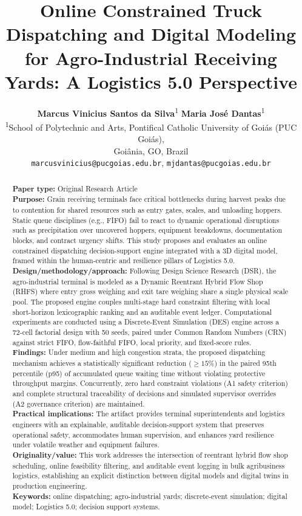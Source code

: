 \documentclass[11pt,a4paper]{article}
\title{\textbf{Online Constrained Truck Dispatching and Digital Modeling for Agro-Industrial Receiving Yards: A Logistics 5.0 Perspective}}
\author{
  \textbf{Marcus Vinicius Santos da Silva}\textsuperscript{1} \quad
  \textbf{Maria Jos{\'e} Dantas}\textsuperscript{1}\\[0.5em]
  \textsuperscript{1}School of Polytechnic and Arts, Pontifical Catholic University of Goi{\'a}s (PUC Goi{\'a}s),\\
  Goi{\^a}nia, GO, Brazil\\
  \texttt{marcusvinicius@pucgoias.edu.br}, \texttt{mjdantas@pucgoias.edu.br}
}
\date{}
\begin{document}
\maketitle

\begin{abstract}
\noindent\textbf{Paper type:} Original Research Article\\
\textbf{Purpose:} Grain receiving terminals face critical bottlenecks during harvest peaks due to contention for shared resources such as entry gates, scales, and unloading hoppers. Static queue disciplines (e.g., FIFO) fail to react to dynamic operational disruptions such as precipitation over uncovered hoppers, equipment breakdowns, documentation blocks, and contract urgency shifts. This study proposes and evaluates an online constrained dispatching decision-support engine integrated with a 3D digital model, framed within the human-centric and resilience pillars of Logistics 5.0.\\
\textbf{Design/methodology/approach:} Following Design Science Research (DSR), the agro-industrial terminal is modeled as a Dynamic Reentrant Hybrid Flow Shop (RHFS) where entry gross weighing and exit tare weighing share a single physical scale pool. The proposed engine couples multi-stage hard constraint filtering with local short-horizon lexicographic ranking and an auditable event ledger. Computational experiments are conducted using a Discrete-Event Simulation (DES) engine across a 72-cell factorial design with 50 seeds, paired under Common Random Numbers (CRN) against strict FIFO, flow-faithful FIFO, local priority, and fixed-score rules.\\
\textbf{Findings:} Under medium and high congestion strata, the proposed dispatching mechanism achieves a statistically significant reduction ($\ge 15\%$) in the paired 95th percentile (p95) of accumulated queue waiting time without violating protective throughput margins. Concurrently, zero hard constraint violations (A1 safety criterion) and complete structural traceability of decisions and simulated supervisor overrides (A2 governance criterion) are maintained.\\
\textbf{Practical implications:} The artifact provides terminal superintendents and logistics engineers with an explainable, auditable decision-support system that preserves operational safety, accommodates human supervision, and enhances yard resilience under volatile weather and equipment failures.\\
\textbf{Originality/value:} This work addresses the intersection of reentrant hybrid flow shop scheduling, online feasibility filtering, and auditable event logging in bulk agribusiness logistics, establishing an explicit distinction between digital models and digital twins in production engineering.\\
\vspace{0.5em}
\noindent\textbf{Keywords:} online dispatching; agro-industrial yards; discrete-event simulation; digital model; Logistics 5.0; decision support systems.
\end{abstract}
\end{document}
